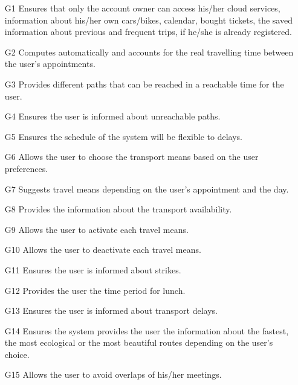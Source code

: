 \documentclass[12pt, a4paper]{article}
\begin{document}
\begin{itemize}
	
	\item [G1] Ensures that only the account owner can access his/her cloud services, information about his/her own cars/bikes, calendar, bought tickets, the saved information about previous and frequent trips, if he/she is already registered.
	
	\item  [G2] Computes automatically and accounts for the real travelling time between the user's appointments.
	
	\item  [G3] Provides different  paths that can be reached in a reachable time for the user.
	
	\item [G4] Ensures the user is informed about unreachable paths.
	
	\item [G5] Ensures the schedule of the system will be flexible to delays.
	
	\item [G6] Allows the user to choose the transport means based on the user preferences.
	
	\item [G7] Suggests travel means depending on the user's appointment and the day.
	
	\item [G8] Provides the information about the transport availability.
	
	\item [G9] Allows the user to activate each travel means.	
	
	\item [G10] Allows the user to deactivate each travel means.
	
	\item [G11] Ensures the user is informed about strikes.
	
	\item [G12] Provides the user the time period for lunch.
	
	\item [G13] Ensures the user is informed about transport delays. 
	
	\item [G14] Ensures the system  provides the user the information about the fastest, the most ecological or the most beautiful routes depending on the user's choice.
	
	\item [G15] Allows the user to avoid overlaps of his/her meetings.
	

\end{itemize}
\end{document}
